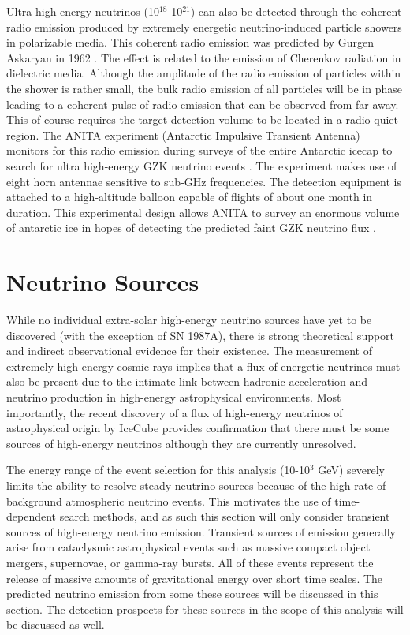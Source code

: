 \documentclass{gatech-thesis}
\begin{document}
Ultra high-energy neutrinos (10$^{18}$-10$^{21}$) can also be detected through the coherent radio emission produced by extremely energetic neutrino-induced particle showers in polarizable media. This coherent radio emission was predicted by Gurgen Askaryan in 1962 \cite{1962SovietJETPAskaryan}. The effect is related to the emission of Cherenkov radiation in dielectric media. Although the amplitude of the radio emission of particles within the shower is rather small, the bulk radio emission of all particles will be in phase leading to a coherent pulse of radio emission that can be observed from far away. This of course requires the target detection volume to be located in a radio quiet region. The ANITA experiment (Antarctic Impulsive Transient Antenna) monitors for this radio emission during surveys of the entire Antarctic icecap to search for ultra high-energy GZK neutrino events \cite{2010PhRvD..82b2004G}. The experiment makes use of eight horn antennae sensitive to sub-GHz frequencies. The detection equipment is attached to a high-altitude balloon capable of flights of about one month in duration. This experimental design allows ANITA to survey an enormous volume of antarctic ice in hopes of detecting the predicted faint GZK neutrino flux \cite{2006astro.ph..7109H}.

\chapter{Neutrino Sources}
While no individual extra-solar high-energy neutrino sources have yet to be discovered (with the exception of SN 1987A), there is strong theoretical support  and indirect observational evidence for their existence. The measurement of extremely high-energy cosmic rays implies that a flux of energetic neutrinos must also be present due to the intimate link between hadronic acceleration and neutrino production in high-energy astrophysical environments. Most importantly, the recent discovery of a flux of high-energy neutrinos of astrophysical origin by IceCube \cite{2013Sci...342E...1I} provides confirmation that there must be some sources of high-energy neutrinos although they are currently unresolved.

The energy range of the event selection for this analysis (10-10$^3$ GeV) severely limits the ability to resolve steady neutrino sources because of the high rate of background atmospheric neutrino events. This motivates the use of time-dependent search methods, and as such this section will only consider transient sources of high-energy neutrino emission. Transient sources of emission generally arise from cataclysmic astrophysical events such as massive compact object mergers, supernovae, or gamma-ray bursts. All of these events represent the release of massive amounts of gravitational energy over short time scales. The predicted neutrino emission from some these sources will be discussed in this section. The detection prospects for these sources in the scope of this analysis will be discussed as well.
\end{document}
